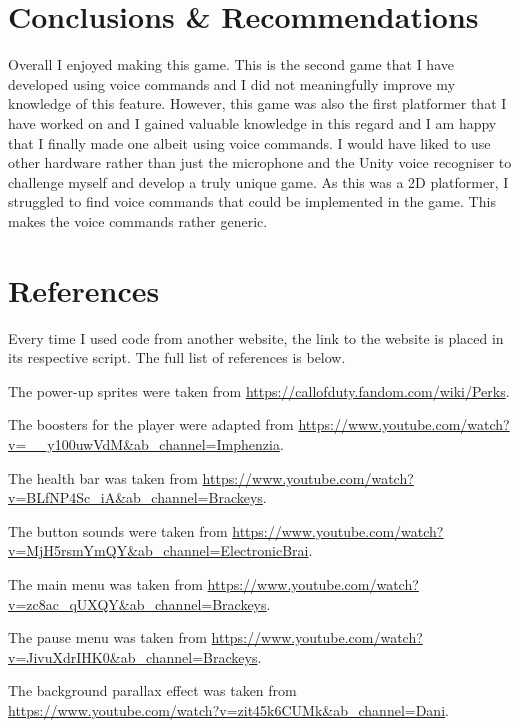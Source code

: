 \documentclass{article}
\begin{document}
\section{Conclusions \& Recommendations}
Overall I enjoyed making this game. This is the second game that I have developed using voice commands and I did not meaningfully improve my knowledge of this feature. However, this game was also the first platformer that I have worked on and I gained valuable knowledge in this regard and I am happy that I finally made one albeit using voice commands. I would have liked to use other hardware rather than just the microphone and the Unity voice recogniser to challenge myself and develop a truly unique game. As this was a 2D platformer, I struggled to find voice commands that could be implemented in the game. This makes the voice commands rather generic.

\section{References}
Every time I used code from another website, the link to the website is placed in its respective script. The full list of references is below.

The power-up sprites were taken from \url{https://callofduty.fandom.com/wiki/Perks}.

The boosters for the player were adapted from \url{https://www.youtube.com/watch?v=__y100uwVdM&ab_channel=Imphenzia}.

The health bar was taken from \url{https://www.youtube.com/watch?v=BLfNP4Sc_iA&ab_channel=Brackeys}.

The button sounds were taken from \url{https://www.youtube.com/watch?v=MjH5rsmYmQY&ab_channel=ElectronicBrai}.

The main menu was taken from \url{https://www.youtube.com/watch?v=zc8ac_qUXQY&ab_channel=Brackeys}.

The pause menu was taken from \url{https://www.youtube.com/watch?v=JivuXdrIHK0&ab_channel=Brackeys}.

The background parallax effect was taken from \url{https://www.youtube.com/watch?v=zit45k6CUMk&ab_channel=Dani}.
\end{document}
